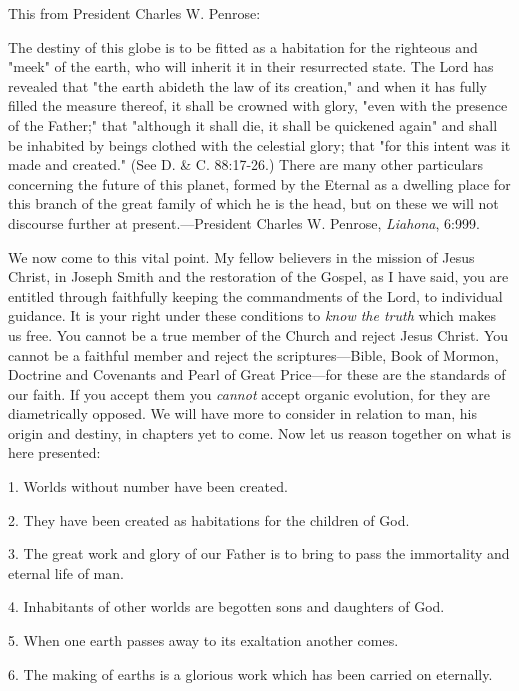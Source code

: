 This from President Charles W. Penrose:

The destiny of this globe is to be fitted as a habitation for the righteous and "meek" of the
earth, who will inherit it in their resurrected state. The Lord has revealed that "the earth
abideth the law of its creation," and when it has fully filled the measure thereof, it shall be
crowned with glory, "even with the presence of the Father;" that "although it shall die, it shall
be quickened again" and shall be inhabited by beings clothed with the celestial glory; that
"for this intent was it made and created." (See D. \& C. 88:17-26.) There are many other
particulars concerning the future of this planet, formed by the Eternal as a dwelling place for
this branch of the great family of which he is the head, but on these we will not discourse
further at present.—President Charles W. Penrose, \textit{Liahona}, 6:999.

We now come to this vital point. My fellow believers in the mission of Jesus Christ, in
Joseph Smith and the restoration of the Gospel, as I have said, you are entitled through
faithfully keeping the commandments of the Lord, to individual guidance. It is your right
under these conditions to \textit{know the truth} which makes us free. You cannot be a true member
of the Church and reject Jesus Christ. You cannot be a faithful member and reject the
scriptures—Bible, Book of Mormon, Doctrine and Covenants and Pearl of Great Price—for
these are the standards of our faith. If you accept them you \textit{cannot} accept organic evolution,
for they are diametrically opposed. We will have more to consider in relation to man, his
origin and destiny, in chapters yet to come. Now let us reason together on what is here
presented:

1. Worlds without number have been created.

2. They have been created as habitations for the children of God.

3. The great work and glory of our Father is to bring to pass the immortality and eternal life
of man.

4. Inhabitants of other worlds are begotten sons and daughters of God.

5. When one earth passes away to its exaltation another comes.

6. The making of earths is a glorious work which has been carried on eternally.

